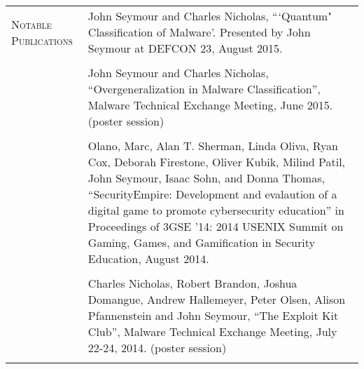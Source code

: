 \begin{tabular}{l p{340pt}}
\textsc{Notable Publications}
& John Seymour and Charles Nicholas, ```Quantum" Classification of Malware'. Presented by John Seymour at DEFCON 23, August 2015.\\ \\
& John Seymour and Charles Nicholas, ``Overgeneralization in Malware Classification'', Malware Technical Exchange Meeting, June 2015. (poster session)\\ \\
& Olano, Marc, Alan T. Sherman, Linda Oliva, Ryan Cox, Deborah Firestone, Oliver Kubik, Milind Patil, John Seymour, Isaac Sohn, and Donna Thomas, ``SecurityEmpire: Development and evalaution of a digital game to promote cybersecurity education'' in Proceedings of 3GSE ’14: 2014 USENIX Summit on Gaming, Games, and Gamification in Security Education, August 2014.\\ \\
& Charles Nicholas, Robert Brandon, Joshua Domangue, Andrew Hallemeyer, Peter Olsen, Alison Pfannenstein and John Seymour, ``The Exploit Kit Club'', Malware Technical Exchange Meeting, July 22-24, 2014.  (poster session)\\ \\


\end{tabular}
